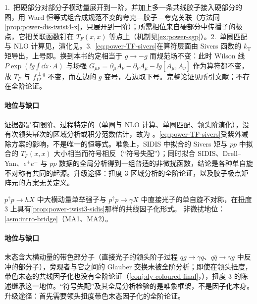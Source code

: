 \begin{proofsketch}
1.~把硬部分对部分子横动量展开到一阶，并加上多一条共线胶子接入硬部分的图，用 Ward 恒等式组合成规范不变的夸克—胶子—夸克关联（方法同\cref{prop:power-dis-twist4-x}，只展开到一阶）；所需相位来自硬部分中传播子的极点，它把关联函数钉在 $T_F(x,x)$ 等点上（机制见\cref{ex:power-sgp}）。2.~单圈匹配与 NLO 计算见\cite{Ji:2006ub,Vogelsang:2009pj}，演化见\cite{Braun:2009mi,Kang:2008ey,Kang:2012em,Schafer:2012ra}。3.~\eqref{eq:power-TF-sivers}在算符层面由 Sivers 函数的 $k_{\mathrm T}$ 矩导出\cite{Boer:2003cm}，上号即\cite[式~(10)]{Kang:2011hk}。换到本书约定相当于 $g\to-g$ 而规范场不变：此时 Wilson 线 $P\exp(\ii g\int\dd z\cdot A)$ 与场强 $G_{\mu\nu}=\partial_\mu A_\nu-\partial_\nu A_\mu-\ii g[A_\mu,A_\nu]$ 作为算符都不变，故 $T_F$ 与 $f^{\perp q}_{1T}$ 不变，而左边的 $g$ 变号，右边取下号。完整论证见所引文献；不存在全阶论证。
\end{proofsketch}

\paragraph{地位与缺口}
证据都是有限阶、过程特定的（单圈与 NLO 计算、单圈匹配、领头阶演化），没有次领头幂次的区域分析或积分范数估计，故为 \tagP。\eqref{eq:power-TF-sivers}受紫外减除方案的影响，不是唯一的恒等式\cite[第~II~节]{Kang:2011hk}。唯象上，SIDIS 中拟合的 Sivers 矩与 $pp$ 中拟合的 $T_F(x,x)$ 大小相当而符号相反（“符号失配”）\cite{Kang:2011hk}；同时拟合 SIDIS、Drell--Yan、$e^+e^-$ 与 $pp$ 数据的全局分析得到一组普适的非微扰函数，结论是各种单自旋不对称有共同的起源\cite{Cammarota:2020qcw}。升级途径：扭度 3 区域分析的全阶论证，以及胶子极点矩阵元的方案无关定义。

\begin{conjecture}\label{conj:power-twist3-pp}
$p^\uparrow p\to hX$ 中大横动量单举强子\cite{Qiu:1998ia}与 $p^\uparrow p\to\gamma X$ 中直接光子\cite{QiuSterman1991c,QiuSterman1992}的单自旋不对称，在扭度 3 上具有\cref{prop:power-twist3-sidis}那样的共线因子化形式。
非微扰地位：\cref{asm:intro-bridge}（MA1、MA2）。
\end{conjecture}

\paragraph{地位与缺口}
末态含大横动量的带色部分子（直接光子的领头阶子过程 $qg\to\gamma q$、$q\bar q\to\gamma g$ 中反冲的部分子），旁观者与它之间的 Glauber 交换未被全阶分析；即使在领头扭度，带色末态的共线因子化也没有全阶论证（\cref{conj:dy-coloured-final}，\tagC），扭度 3 的陈述继承这一地位。“符号失配”及其全局分析检验的是唯象框架，不是因子化本身。升级途径：首先需要领头扭度带色末态因子化的全阶论证。

